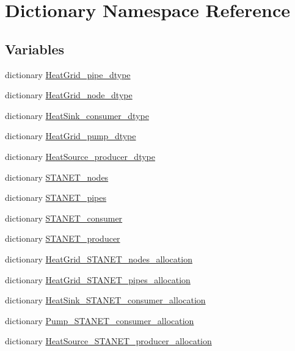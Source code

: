 \hypertarget{namespace_dictionary}{}\section{Dictionary Namespace Reference}
\label{namespace_dictionary}
\subsection*{Variables}
\begin{DoxyCompactItemize}
\item 
dictionary \hyperlink{namespace_dictionary_a81817c3683d83c45721baf9ac7a0f324}{Heat\+Grid\+\_\+pipe\+\_\+dtype}
\item 
dictionary \hyperlink{namespace_dictionary_a302fe29521940f3c902f1d1be3652eea}{Heat\+Grid\+\_\+node\+\_\+dtype}
\item 
dictionary \hyperlink{namespace_dictionary_a87613937e78bcf53500a014dfffc9bef}{Heat\+Sink\+\_\+consumer\+\_\+dtype}
\item 
dictionary \hyperlink{namespace_dictionary_a616d65efc5bb5f169c0fb9781b4292c2}{Heat\+Grid\+\_\+pump\+\_\+dtype}
\item 
dictionary \hyperlink{namespace_dictionary_abeaeccad0ef3f237fd95ed21a43fa64e}{Heat\+Source\+\_\+producer\+\_\+dtype}
\item 
dictionary \hyperlink{namespace_dictionary_a716974bfb5b5b6f527f42b336c7d8a78}{S\+T\+A\+N\+E\+T\+\_\+nodes}
\item 
dictionary \hyperlink{namespace_dictionary_a57c00cf376cd84145639bfb65b4e155c}{S\+T\+A\+N\+E\+T\+\_\+pipes}
\item 
dictionary \hyperlink{namespace_dictionary_a4d548616b60c21d9481e34dc5f56ff6d}{S\+T\+A\+N\+E\+T\+\_\+consumer}
\item 
dictionary \hyperlink{namespace_dictionary_aeea7b54a3132a64d164394f80e275ee1}{S\+T\+A\+N\+E\+T\+\_\+producer}
\item 
dictionary \hyperlink{namespace_dictionary_a98301ff2458867192a5d80b8d59dfe94}{Heat\+Grid\+\_\+\+S\+T\+A\+N\+E\+T\+\_\+nodes\+\_\+allocation}
\item 
dictionary \hyperlink{namespace_dictionary_a7c7183d62ec27e3eabf3fa48e77d7cba}{Heat\+Grid\+\_\+\+S\+T\+A\+N\+E\+T\+\_\+pipes\+\_\+allocation}
\item 
dictionary \hyperlink{namespace_dictionary_a334d744a07f946e317946dbd8b5785bf}{Heat\+Sink\+\_\+\+S\+T\+A\+N\+E\+T\+\_\+consumer\+\_\+allocation}
\item 
dictionary \hyperlink{namespace_dictionary_a372356497cc875933e355473f718698c}{Pump\+\_\+\+S\+T\+A\+N\+E\+T\+\_\+consumer\+\_\+allocation}
\item 
dictionary \hyperlink{namespace_dictionary_a3edbaf1cfe1d45f0558ddc8cd934b6d3}{Heat\+Source\+\_\+\+S\+T\+A\+N\+E\+T\+\_\+producer\+\_\+allocation}
\end{DoxyCompactItemize}


